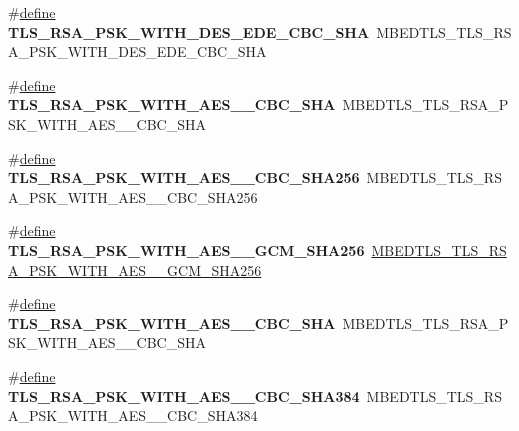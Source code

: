 \begin{DoxyCompactItemize}
\item 
\mbox{\label{compat-1_83_8h_a292e9ea6d08e7dd4421771a966242433}} 
\#\hyperlink{structdefine}{define} {\bfseries T\+L\+S\+\_\+\+R\+S\+A\+\_\+\+P\+S\+K\+\_\+\+W\+I\+T\+H\+\_\+D\+E\+S\+\_\+\+E\+D\+E\+\_\+\+C\+B\+C\+\_\+\+S\+HA}~M\+B\+E\+D\+T\+L\+S\+\_\+\+T\+L\+S\+\_\+\+R\+S\+A\+\_\+\+P\+S\+K\+\_\+\+W\+I\+T\+H\+\_\+D\+E\+S\+\_\+\+E\+D\+E\+\_\+\+C\+B\+C\+\_\+\+S\+HA
\item 
\mbox{\label{compat-1_83_8h_ab490c7b7ef2ff4248cfa7fab5692bdf9}} 
\#\hyperlink{structdefine}{define} {\bfseries T\+L\+S\+\_\+\+R\+S\+A\+\_\+\+P\+S\+K\+\_\+\+W\+I\+T\+H\+\_\+\+A\+E\+S\+\_\+\_\+\+C\+B\+C\+\_\+\+S\+HA}~M\+B\+E\+D\+T\+L\+S\+\_\+\+T\+L\+S\+\_\+\+R\+S\+A\+\_\+\+P\+S\+K\+\_\+\+W\+I\+T\+H\+\_\+\+A\+E\+S\+\_\+\_\+\+C\+B\+C\+\_\+\+S\+HA
\item 
\mbox{\label{compat-1_83_8h_a82fc4ebb2304ddb1b17159376684886c}} 
\#\hyperlink{structdefine}{define} {\bfseries T\+L\+S\+\_\+\+R\+S\+A\+\_\+\+P\+S\+K\+\_\+\+W\+I\+T\+H\+\_\+\+A\+E\+S\+\_\+\_\+\+C\+B\+C\+\_\+\+S\+H\+A256}~M\+B\+E\+D\+T\+L\+S\+\_\+\+T\+L\+S\+\_\+\+R\+S\+A\+\_\+\+P\+S\+K\+\_\+\+W\+I\+T\+H\+\_\+\+A\+E\+S\+\_\+\_\+\+C\+B\+C\+\_\+\+S\+H\+A256
\item 
\mbox{\label{compat-1_83_8h_a40485748c47a266fe7a87367601cbfc5}} 
\#\hyperlink{structdefine}{define} {\bfseries T\+L\+S\+\_\+\+R\+S\+A\+\_\+\+P\+S\+K\+\_\+\+W\+I\+T\+H\+\_\+\+A\+E\+S\+\_\+\_\+\+G\+C\+M\+\_\+\+S\+H\+A256}~\hyperlink{ssl__ciphersuites_8h_a28346136cb2c9519fd971bafa9097644}{M\+B\+E\+D\+T\+L\+S\+\_\+\+T\+L\+S\+\_\+\+R\+S\+A\+\_\+\+P\+S\+K\+\_\+\+W\+I\+T\+H\+\_\+\+A\+E\+S\+\_\+\_\+\+G\+C\+M\+\_\+\+S\+H\+A256}
\item 
\mbox{\label{compat-1_83_8h_a398f63bfb0f3ed4acbfa8732e7c91af3}} 
\#\hyperlink{structdefine}{define} {\bfseries T\+L\+S\+\_\+\+R\+S\+A\+\_\+\+P\+S\+K\+\_\+\+W\+I\+T\+H\+\_\+\+A\+E\+S\+\_\+\_\+\+C\+B\+C\+\_\+\+S\+HA}~M\+B\+E\+D\+T\+L\+S\+\_\+\+T\+L\+S\+\_\+\+R\+S\+A\+\_\+\+P\+S\+K\+\_\+\+W\+I\+T\+H\+\_\+\+A\+E\+S\+\_\+\_\+\+C\+B\+C\+\_\+\+S\+HA
\item 
\mbox{\label{compat-1_83_8h_a4bcd3b42973e74d841f05557e251ca03}} 
\#\hyperlink{structdefine}{define} {\bfseries T\+L\+S\+\_\+\+R\+S\+A\+\_\+\+P\+S\+K\+\_\+\+W\+I\+T\+H\+\_\+\+A\+E\+S\+\_\+\_\+\+C\+B\+C\+\_\+\+S\+H\+A384}~M\+B\+E\+D\+T\+L\+S\+\_\+\+T\+L\+S\+\_\+\+R\+S\+A\+\_\+\+P\+S\+K\+\_\+\+W\+I\+T\+H\+\_\+\+A\+E\+S\+\_\+\_\+\+C\+B\+C\+\_\+\+S\+H\+A384

\end{DoxyCompactItemize}
